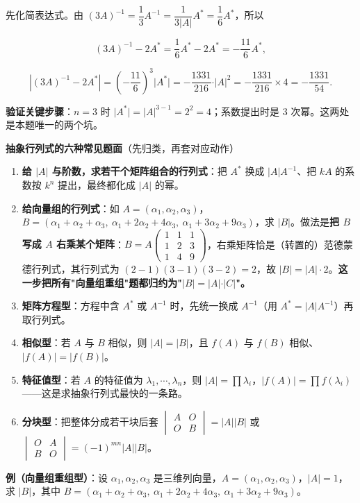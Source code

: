 \documentclass[11pt,openany,UTF8]{ctexbook}
\begin{document}
先化简表达式。由 $(3A)^{-1}=\dfrac{1}{3}A^{-1}=\dfrac{1}{3\vert A\vert}A^*=\dfrac{1}{6}A^*$，所以

\[(3A)^{-1}-2A^*=\frac{1}{6}A^*-2A^*=-\frac{11}{6}A^*,\]

\[\left\vert (3A)^{-1}-2A^*\right\vert=\left(-\frac{11}{6}\right)^3\vert A^*\vert=-\frac{1331}{216}\cdot\vert A\vert^{2}=-\frac{1331}{216}\times4=-\frac{1331}{54}.\]

\textbf{验证关键步骤}：$n=3$ 时 $\vert A^*\vert=\vert A\vert^{3-1}=2^2=4$；系数提出时是 $3$ 次幂。这两处是本题唯一的两个坑。

\textbf{抽象行列式的六种常见题面}（先归类，再套对应动作）

\begin{enumerate}
\item \textbf{给 $\vert A\vert$ 与阶数，求若干个矩阵组合的行列式}：把 $A^*$ 换成 $\vert A\vert A^{-1}$、把 $kA$ 的系数按 $k^n$ 提出，最终都化成 $\vert A\vert$ 的幂。
\item \textbf{给向量组的行列式}：如 $A=(\alpha_1,\alpha_2,\alpha_3)$，$B=(\alpha_1+\alpha_2+\alpha_3,\ \alpha_1+2\alpha_2+4\alpha_3,\ \alpha_1+3\alpha_2+9\alpha_3)$，求 $\vert B\vert$。做法是\textbf{把 $B$ 写成 $A$ 右乘某个矩阵}：$B=A\begin{pmatrix}1&1&1\\1&2&3\\1&4&9\end{pmatrix}$，右乘矩阵恰是（转置的）范德蒙德行列式，其行列式为 $(2-1)(3-1)(3-2)=2$，故 $\vert B\vert=\vert A\vert\cdot2$。\textbf{这一步把所有"向量组重组"题都归约为"$\vert B\vert=\vert A\vert\cdot\vert C\vert$"。}
\item \textbf{矩阵方程型}：方程中含 $A^*$ 或 $A^{-1}$ 时，先统一换成 $A^{-1}$（用 $A^*=\vert A\vert A^{-1}$）再取行列式。
\item \textbf{相似型}：若 $A$ 与 $B$ 相似，则 $\vert A\vert=\vert B\vert$，且 $f(A)$ 与 $f(B)$ 相似、$\vert f(A)\vert=\vert f(B)\vert$。
\item \textbf{特征值型}：若 $A$ 的特征值为 $\lambda_1,\cdots,\lambda_n$，则 $\vert A\vert=\prod\lambda_i$，$\vert f(A)\vert=\prod f(\lambda_i)$——这是求抽象行列式最快的一条路。
\item \textbf{分块型}：把整体分成若干块后套 $\begin{vmatrix}A&O\\O&B\end{vmatrix}=\vert A\vert\vert B\vert$ 或 $\begin{vmatrix}O&A\\B&O\end{vmatrix}=(-1)^{mn}\vert A\vert\vert B\vert$。
\end{enumerate}
\textbf{例（向量组重组型）}：设 $\alpha_1,\alpha_2,\alpha_3$ 是三维列向量，$A=(\alpha_1,\alpha_2,\alpha_3)$，$\vert A\vert=1$，求 $\vert B\vert$，其中 $B=(\alpha_1+\alpha_2+\alpha_3,\ \alpha_1+2\alpha_2+4\alpha_3,\ \alpha_1+3\alpha_2+9\alpha_3)$。
\end{document}
